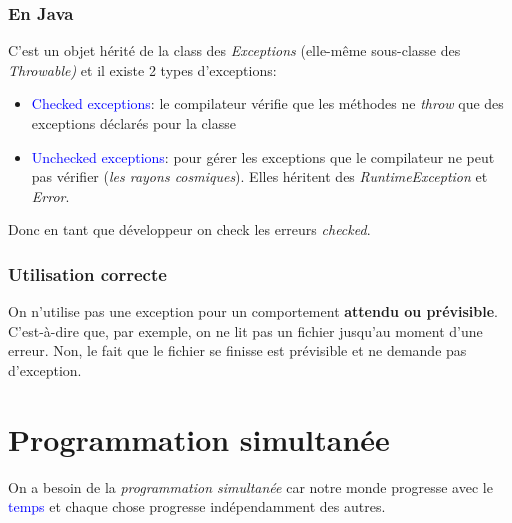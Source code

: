\documentclass{report}
\begin{document}
\subsection{En Java}
C'est un objet hérité de la class des \textit{Exceptions} (elle-même sous-classe des \textit{Throwable)} et il existe 2 types d'exceptions:
\begin{itemize}
\item \textcolor{blue}{Checked exceptions}: le compilateur vérifie que les méthodes ne \textit{throw} que des exceptions déclarés pour la classe
\item \textcolor{blue}{Unchecked exceptions}: pour gérer les exceptions que le compilateur ne peut pas vérifier (\textit{les rayons cosmiques}). Elles héritent des \textit{RuntimeException} et \textit{Error}.
\end{itemize}
Donc en tant que développeur on check les erreurs \textit{checked}.

\subsection{Utilisation correcte}
On n'utilise pas une exception pour un comportement \textbf{attendu ou prévisible}. C'est-à-dire que, par exemple, on ne lit pas un fichier jusqu'au moment d'une erreur. Non, le fait que le fichier se finisse est prévisible et ne demande pas d'exception.


\chapter{Programmation simultanée}
On a besoin de la \textit{programmation simultanée} car notre monde progresse avec le \textcolor{blue}{temps} et chaque chose progresse indépendamment des autres.
\end{document}

